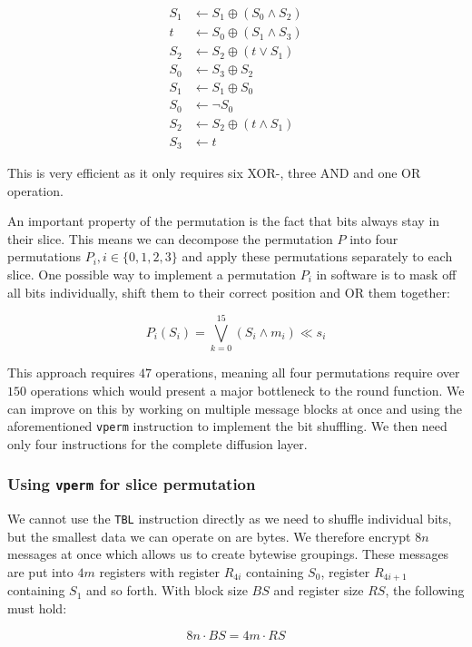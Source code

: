 \documentclass[12pt]{report}
\begin{document}
\begin{align*}
    S_1&\leftarrow S_1\oplus (S_0\land S_2) \\
    t&\leftarrow S_0\oplus (S_1\land S_3) \\
    S_2&\leftarrow S_2\oplus (t\lor S_1) \\
    S_0&\leftarrow S_3\oplus S_2 \\
    S_1&\leftarrow S_1\oplus S_0 \\
    S_0&\leftarrow \lnot S_0 \\
    S_2&\leftarrow S_2\oplus (t\land S_1) \\
    S_3&\leftarrow t
\end{align*}

This is very efficient as it only requires six XOR-, three AND and one OR
operation.

An important property of the permutation is the fact that bits always stay in
their slice. This means we can decompose the permutation $P$ into four
permutations $P_i,i\in\{0,1,2,3\}$ and apply these permutations
separately to each slice. One possible way to implement a permutation $P_i$ in
software is to mask off all bits individually, shift them to their correct
position and OR them together:

\[
    P_i(S_i)=\bigvee_{k=0}^{15}{(S_i\land m_i) \ll s_i}
\]

This approach requires $47$ operations, meaning all four permutations require
over $150$ operations which would present a major bottleneck to the round
function. We can improve on this by working on multiple message blocks at once
and using the aforementioned \texttt{vperm} instruction to implement the bit
shuffling. We then need only four instructions for the complete diffusion
layer.

\subsubsection{Using \texttt{vperm} for slice permutation}

We cannot use the \texttt{TBL} instruction directly as we need to shuffle
individual bits, but the smallest data we can operate on are bytes. We
therefore encrypt $8n$ messages at once which allows us to create bytewise
groupings. These messages are put into $4m$ registers with register $R_{4i}$
containing $S_0$, register $R_{4i+1}$ containing $S_1$ and so forth. With block
size $BS$ and register size $RS$, the following must hold:

\[
    8n\cdot BS=4m\cdot RS
\]
\end{document}
